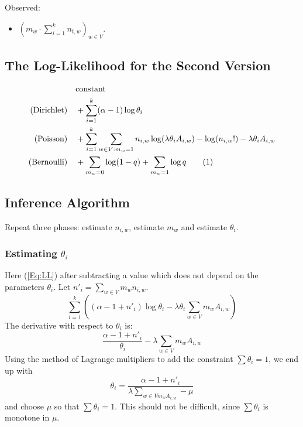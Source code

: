 \documentclass{article}
\begin{document}
Observed:
\begin{itemize}
\item $(m_w \cdot \sum_{i=1}^k n_{t, w})_{w \in V}$.
\end{itemize}

\subsection{The Log-Likelihood for the Second Version}

\begin{align*}
                             & \mathrm{constant} \\
    \text{(Dirichlet)} \quad & + \sum_{i=1}^k (\alpha-1) \log \theta_i \\
    \text{(Poisson)}   \quad & + \sum_{i=1}^k \sum_{w \in V: m_w = 1} n_{i, w} \log (\lambda \theta_i A_{i, w}) - \log (n_{i, w}!) - \lambda \theta_i A_{i, w} \\
    \text{(Bernoulli)} \quad & + \sum_{m_w=0} \log(1-q) + \sum_{m_w=1} \log q \addtocounter{equation}{1} \tag{\theequation} \label{Eq:LL}
\end{align*}

\subsection{Inference Algorithm}

Repeat three phases: estimate $n_{i,w}$, estimate $m_w$ and estimate $\theta_i$.

\subsubsection{Estimating $\theta_i$}

Here (\ref{Eq:LL}) after subtracting a value which does not depend on the
    parameters $\theta_i$.
Let $n'_i=\sum_{w \in V}m_w n_{i, w}$.
\begin{equation}
    \sum_{i=1}^k
    \left(
        (\alpha-1 + n'_i) \log \theta_i
        - \lambda \theta_i \sum_{w \in V} m_w A_{i, w}
    \right)
\end{equation}
The derivative with respect to $\theta_i$ is:
\begin{equation}
    \frac {\alpha-1 + n'_i} {\theta_i}
    - \lambda \sum_{w \in V} m_w A_{i, w}
\end{equation}
Using the method of Lagrange multipliers to add the constraint
    $\sum \theta_i = 1$, we end up with
\begin{equation}
    \theta_i = \frac {\alpha - 1 + n'_i} {\lambda \sum_{{w \in V} m_w A_{i, w}} - \mu}
\end{equation}
and choose $\mu$ so that $\sum \theta_i = 1$.  This should not be difficult, since $\sum \theta_i$ is monotone in $\mu$.
\end{document}
